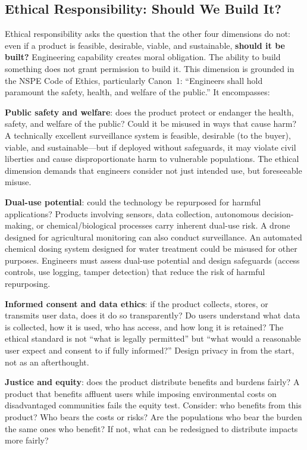 \subsection{Ethical Responsibility: Should We Build It?}
Ethical responsibility asks the question that the other four dimensions do not: even if a product is feasible, desirable, viable, and sustainable, \textbf{should it be built?} Engineering capability creates moral obligation. The ability to build something does not grant permission to build it. This dimension is grounded in the NSPE Code of Ethics, particularly Canon~1: ``Engineers shall hold paramount the safety, health, and welfare of the public.'' It encompasses:

\textbf{Public safety and welfare}: does the product protect or endanger the health, safety, and welfare of the public? Could it be misused in ways that cause harm? A technically excellent surveillance system is feasible, desirable (to the buyer), viable, and sustainable---but if deployed without safeguards, it may violate civil liberties and cause disproportionate harm to vulnerable populations. The ethical dimension demands that engineers consider not just intended use, but foreseeable misuse.

\textbf{Dual-use potential}: could the technology be repurposed for harmful applications? Products involving sensors, data collection, autonomous decision-making, or chemical/biological processes carry inherent dual-use risk. A drone designed for agricultural monitoring can also conduct surveillance. An automated chemical dosing system designed for water treatment could be misused for other purposes. Engineers must assess dual-use potential and design safeguards (access controls, use logging, tamper detection) that reduce the risk of harmful repurposing.

\textbf{Informed consent and data ethics}: if the product collects, stores, or transmits user data, does it do so transparently? Do users understand what data is collected, how it is used, who has access, and how long it is retained? The ethical standard is not ``what is legally permitted'' but ``what would a reasonable user expect and consent to if fully informed?'' Design privacy in from the start, not as an afterthought.

\textbf{Justice and equity}: does the product distribute benefits and burdens fairly? A product that benefits affluent users while imposing environmental costs on disadvantaged communities fails the equity test. Consider: who benefits from this product? Who bears the costs or risks? Are the populations who bear the burden the same ones who benefit? If not, what can be redesigned to distribute impacts more fairly?

